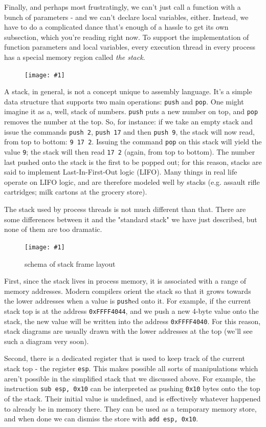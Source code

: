 \documentclass{article}
\newcommand{\wrapimageleftcap}[2] {\begin{figure}\begin{center}\texttt{[image: \#1]}\end{center}\caption{#2}\end{figure}
}
\newcommand{\wrapimageright}[1] {
    \begin{figure}
        \begin{center}
            \texttt{[image: \#1]} 
        \end{center}
    \end{figure}
}
\newcommand{\xcode}[2]{\colorbox{ubuntuback}{\lstinline[language=#1]|#2|}}
\newcommand{\asm}[1]{\xcode{{[x86masm]assembler}}{#1}}
\newcommand{\code}[1]{\colorbox{ubuntuback}{\texttt{#1}}}
\begin{document}
Finally, and perhaps most frustratingly, we can't just call a function with a bunch of parameters - and we can't declare local variables, either. Instead, we have to do a complicated dance that's enough of a hassle to get its own subsection, which you're reading right now. To support the implementation of function parameters and local variables, every execution thread in every process has a special memory region called \textit{the stack}. 

\wrapimageright{./images/stack.jpg}
A stack, in general, is not a concept unique to assembly language. It's a simple data structure that supports two main operations: \code{push} and \code{pop}. One might imagine it as a, well, stack of numbers. \code{push} puts a new number on top, and \code{pop} removes the number at the top. So, for instance: if we take an empty stack and issue the commands \code{push 2}, \code{push 17} and then \code{push 9}, the stack will now read, from top to bottom: \code{9 17 2}. Issuing the command \code{pop} on this stack will yield the value \code{9}; the stack will then read \code{17 2} (again, from top to bottom). The number last pushed onto the stack is the first to be popped out; for this reason, stacks are said to implement Last-In-First-Out logic (LIFO). Many things in real life operate on LIFO logic, and are therefore modeled well by stacks (e.g. assault rifle cartridges; milk cartons at the grocery store).

The stack used by process threads is not much different than that. There are some differences between it and the "standard stack" we have just described, but none of them are too dramatic. 

\wrapimageleftcap{./images/stack_frame.png}{schema of stack frame layout}
First, since the stack lives in process memory, it is associated with a range of memory addresses. Modern compilers orient the stack so that it grows towards the lower addresses when a value is \code{push}ed onto it. For example, if the current stack top is at the address \code{0xFFFF4044}, and we push a new 4-byte value onto the stack, the new value will be written into the address \code{0xFFFF4040}. For this reason, stack diagrams are usually drawn with the lower addresses at the top (we'll see such a diagram very soon).

Second, there is a dedicated register that is used to keep track of the current stack top - the register \asm{esp}. This makes possible all sorts of manipulations which aren't possible in the simplified stack that we discussed above. For example, the instruction \asm{sub esp, 0x10} can be interpreted as pushing \code{0x10} bytes onto the top of the stack. Their initial value is undefined, and is effectively whatever happened to already be in memory there. They can be used as a temporary memory store, and when done we can dismiss the store with \asm{add esp, 0x10}.
\end{document}
